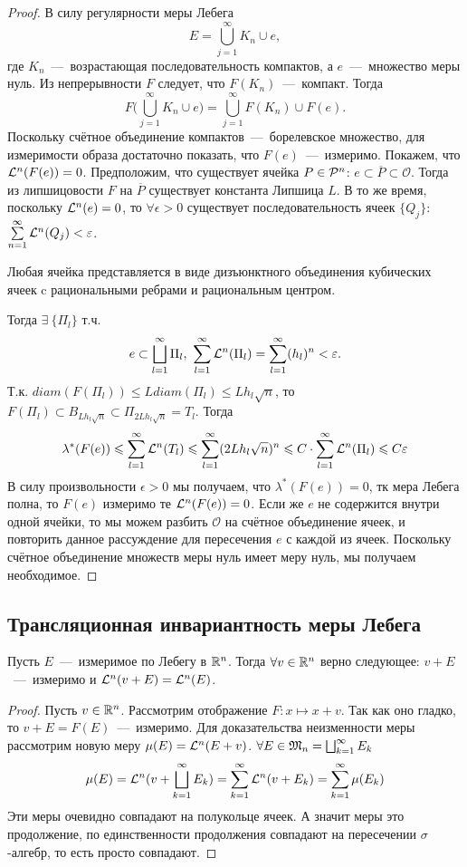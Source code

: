 \begin{proof}
    В силу регулярности меры Лебега \[E = \bigcup\limits_{j = 1}^\infty K_n \cup e,\]
    где $K_n$~---~возрастающая последовательность компактов, а $e$~---~множество меры нуль. Из непрерывности $F$ следует, что $F(K_n)$~---~компакт. Тогда \[F\biggr(\bigcup\limits_{j = 1}^\infty K_n \cup e\biggr) = \bigcup\limits_{j = 1}^\infty F(K_n) \cup F(e).\]
    Поскольку счётное объединение компактов~---~борелевское множество, для измеримости образа достаточно показать, что $F(e)$~---~измеримо. Покажем, что $\mathcal{L}^n(F(e)) = 0$. Предположим, что существует ячейка $P \in \mathcal{P}^n$: $e \subset \overline{P} \subset \mathcal{O}$. Тогда из липшицовости $F$ на $\overline{P}$ существует константа Липшица $L$. В то же время, поскольку $\mathcal{L}^n(e) = 0$, то $\forall \epsilon > 0$ существует последовательность ячеек $\{Q_j\}$: $\sum\limits_{n = 1}^\infty \mathcal{L}^n(Q_j) < \varepsilon$.
\begin{fact}
    Любая ячейка представляется в виде дизъюнктного объединения кубических ячеек c рациональными ребрами и рациональным центром.
\end{fact}
    Тогда $\exists \  \{\Pi_l\}$ т.ч. \[e \subset \bigsqcup\limits_{l = 1}^\infty \Pi_l, \ \sum\limits_{l = 1}^\infty \mathcal{L}^n(\Pi_l) = \sum\limits_{l = 1}^\infty (h_l)^n < \varepsilon.\]
    Т.к. $diam(F(\Pi_l)) \leq Ldiam(\Pi_l) \leq Lh_l\sqrt{n}$,
    то $F(\Pi_l) \subset B_{Lh_l\sqrt{n}} \subset \Pi_{2Lh_l\sqrt{n}} = T_l$. Тогда \[\lambda^*(F(e)) \leqslant \sum\limits_{l = 1}^\infty \mathcal{L}^n(T_l) \leqslant \sum\limits_{l = 1}^\infty (2Lh_l\sqrt{n})^n \leqslant C\cdot\sum\limits_{l = 1}^\infty \mathcal{L}^n(\Pi_l) \leqslant C\varepsilon\]
    В силу произвольности $\epsilon > 0$ мы получаем, что $\lambda^*(F(e)) = 0$, тк мера Лебега полна, то $F(e)$ измеримо те $\mathcal{L}^n(F(e)) = 0$. Если же $e$ не содержится внутри одной ячейки, то мы можем разбить $\mathcal{O}$ на счётное объединение ячеек, и повторить данное рассуждение для пересечения $e$ с каждой из ячеек. Поскольку счётное объединение множеств меры нуль имеет меру нуль, мы получаем необходимое. 
\end{proof}
\subsection{Трансляционная инвариантность меры Лебега}
\begin{theorem}
    Пусть $E$~---~измеримое по Лебегу в $\mathbb{R}^n$. Тогда $\forall v \in \mathbb{R}^n$ верно следующее: $v + E$~---~измеримо и $\mathcal{L}^n(v + E) = \mathcal{L}^n(E)$.
\end{theorem}
\begin{proof}
    Пусть $v \in \mathbb{R}^n$. Рассмотрим отображение $F: x \mapsto x + v$. Так как оно гладко, то $v + E = F(E)$~---~измеримо. Для доказательства неизменности меры рассмотрим новую меру $\mu(E) = \mathcal{L}^n(E + v)$.  $\forall E \in \mathfrak{M}_n = \bigsqcup_{k=1}^{\infty}E_k$
    \[
    \mu(E) = \mathcal{L}^n( v + \bigsqcup_{k=1}^{\infty} E_k) = \sum_{k=1}^{\infty}\mathcal{L}^n(v + E_k) = \sum_{k=1}^{\infty}\mu(E_k)
    \]
    Эти меры очевидно совпадают на полукольце ячеек. А значит меры это продолжение, по единственности продолжения совпадают на пересечении $\sigma$-алгебр, то есть просто совпадают.
\end{proof}

